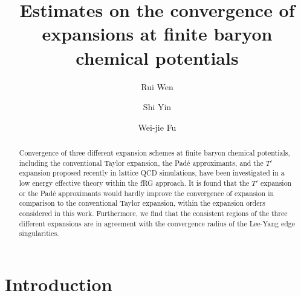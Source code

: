 \documentclass[%
reprint,
superscriptaddress,
preprintnumbers,
amsmath,amssymb,
aps,
prd,
]{revtex4-2}
\begin{document}
	
\title{Estimates on the convergence of expansions at finite baryon chemical potentials}

\author{Rui Wen}
  
\author{Shi Yin}
	
\author{Wei-jie Fu}
	
	
\begin{abstract}

Convergence of three different expansion schemes at finite baryon chemical potentials, including the conventional Taylor expansion, the Pad\'e approximants, and the $T'$ expansion proposed recently in lattice QCD simulations, have been investigated in a low energy effective theory within the fRG approach. It is found that the $T'$ expansion or the Pad\'e approximants would hardly improve the convergence of expansion in comparison to the conventional Taylor expansion, within the expansion orders considered in this work. Furthermore, we find that the consistent regions of the three different expansions are in agreement with the convergence radius of the Lee-Yang edge singularities.

\end{abstract}


\maketitle
	
\section{Introduction}
\label{sec:int}
\end{document}
